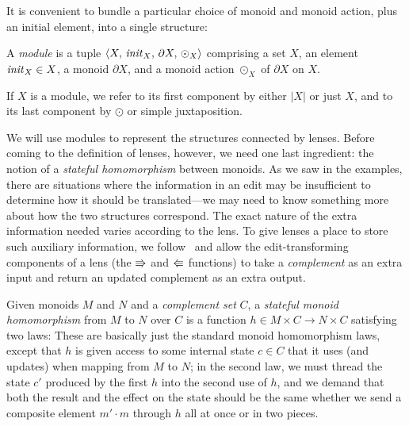 It is convenient to bundle a particular choice of monoid and monoid
action, plus an initial element, into a single structure:

\begin{definition}
    A \emph{module} is a tuple $\left<X,\, \mathit{init}_X,\, \partial
    X,\,\odot_X\right>$ comprising a set $X$, an element $\mathit{init}_X\in X$, a monoid
    $\partial X$, and a monoid action $\odot_X$ of $\partial X$ on $X$.
\end{definition}
If $X$ is a module, we refer to its first component by either
$|X|$ or just $X$, and to its last component by $\odot$ or simple
juxtaposition.

We will use modules to represent the structures connected by lenses.  Before
coming to the definition of lenses, however, we need one last ingredient:
the notion of a {\em stateful homomorphism} between monoids.  As we saw in
the examples, there are situations where the information in an
edit may be insufficient to determine how it should be translated---we may
need to know something more about how the two structures correspond. The
exact nature of the extra information needed varies according to the lens.
%
To give lenses a place to store such auxiliary information, we
follow~\cite{HofmannPierceWagner10} and allow the edit-transforming
components of a lens (the $\mathord{\Rrightarrow}$ and $\mathord{\Lleftarrow}$ functions) to take a {\em
  complement} as an extra input and return an updated complement as an extra
output.
%
\iflater
{}  
\fi

\begin{definition}
Given monoids $M$ and $N$ and a {\em complement set} $C$, a \emph{stateful monoid
  homomorphism} from $M$ to $N$ over $C$ is a function $h \in M \times C \to
N \times C$ satisfying two laws:
%
\vspace*{-1ex}
%
These are basically just the standard monoid homomorphism laws, except that
$h$ is given access to some internal state $c \in C$ that it uses (and
updates) when mapping from $M$ to $N$; in the second law, we must thread the
state $c'$ produced by the first $h$ into the second use of $h$, and we
demand that both the result and the effect on the state should be the same
whether we send a composite element $m' \cdot m$ through $h$ all at once or
in two pieces.
\end{definition}

